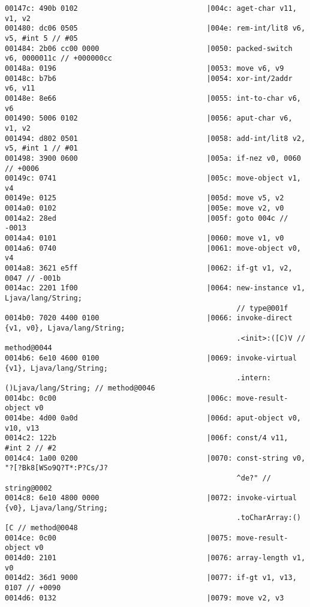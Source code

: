 \begin{lstlisting}
00147c: 490b 0102                              |004c: aget-char v11, v1, v2
001480: dc06 0505                              |004e: rem-int/lit8 v6, v5, #int 5 // #05
001484: 2b06 cc00 0000                         |0050: packed-switch v6, 0000011c // +000000cc
00148a: 0196                                   |0053: move v6, v9
00148c: b7b6                                   |0054: xor-int/2addr v6, v11
00148e: 8e66                                   |0055: int-to-char v6, v6
001490: 5006 0102                              |0056: aput-char v6, v1, v2
001494: d802 0501                              |0058: add-int/lit8 v2, v5, #int 1 // #01
001498: 3900 0600                              |005a: if-nez v0, 0060 // +0006
00149c: 0741                                   |005c: move-object v1, v4
00149e: 0125                                   |005d: move v5, v2
0014a0: 0102                                   |005e: move v2, v0
0014a2: 28ed                                   |005f: goto 004c // -0013
0014a4: 0101                                   |0060: move v1, v0
0014a6: 0740                                   |0061: move-object v0, v4
0014a8: 3621 e5ff                              |0062: if-gt v1, v2, 0047 // -001b
0014ac: 2201 1f00                              |0064: new-instance v1, Ljava/lang/String;
                                                      // type@001f
0014b0: 7020 4400 0100                         |0066: invoke-direct {v1, v0}, Ljava/lang/String;
                                                      .<init>:([C)V // method@0044
0014b6: 6e10 4600 0100                         |0069: invoke-virtual {v1}, Ljava/lang/String;
                                                      .intern:()Ljava/lang/String; // method@0046
0014bc: 0c00                                   |006c: move-result-object v0
0014be: 4d00 0a0d                              |006d: aput-object v0, v10, v13
0014c2: 122b                                   |006f: const/4 v11, #int 2 // #2
0014c4: 1a00 0200                              |0070: const-string v0, "?[?Bk8[WSo9Q?T*:P?Cs/J?
                                                      ^de?" // string@0002
0014c8: 6e10 4800 0000                         |0072: invoke-virtual {v0}, Ljava/lang/String;
                                                      .toCharArray:()[C // method@0048
0014ce: 0c00                                   |0075: move-result-object v0
0014d0: 2101                                   |0076: array-length v1, v0
0014d2: 36d1 9000                              |0077: if-gt v1, v13, 0107 // +0090
0014d6: 0132                                   |0079: move v2, v3

\end{lstlisting}

